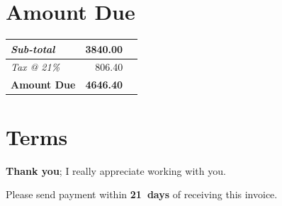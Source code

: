 \documentclass[a4paper,table]{article}
\begin{document}
\section*{Amount Due}
\label{sec:orgheadline2}

\hfill\colorbox{prlp-gray96}{\begin{minipage}{7.5cm}
\begin{center}
\begin{tabu}{Xrl}
\emph{Sub-total} & 3840.00 & \texteuro{}\\
\hline
\emph{Tax @ 21\%} & 806.40 & \texteuro{}\\
\hline
\textbf{Amount Due} & \textbf{4646.40} & \textbf{\texteuro{}}\\
\end{tabu}
\end{center}

\end{minipage}}

\section*{Terms}
\label{sec:orgheadline3}

\textbf{Thank you}; I really appreciate working with you.

Please send payment within \textbf{21~days} of receiving this invoice.

\vfill
\end{document}
